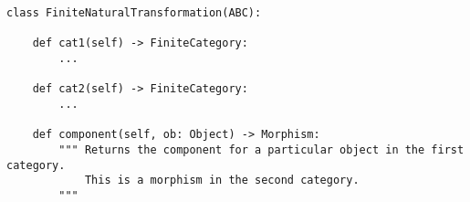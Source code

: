\begin{verbatim}
class FiniteNaturalTransformation(ABC):

    def cat1(self) -> FiniteCategory:
        ...

    def cat2(self) -> FiniteCategory:
        ...

    def component(self, ob: Object) -> Morphism:
        """ Returns the component for a particular object in the first category.
            This is a morphism in the second category.
        """
\end{verbatim}